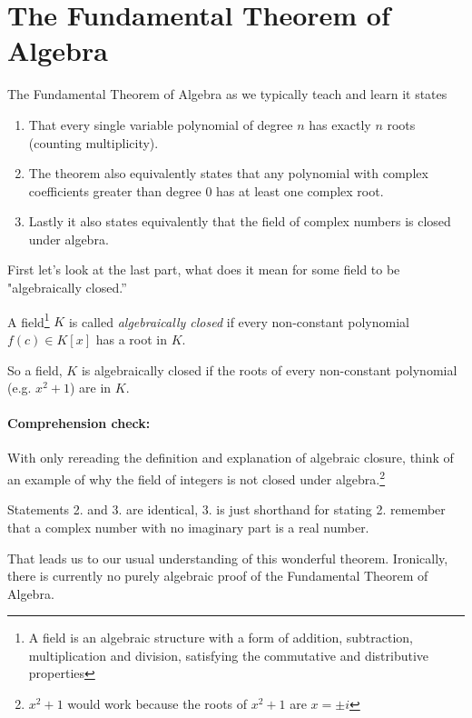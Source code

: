 \documentclass[12pt]{article}
\begin{document}








\section*{The Fundamental Theorem of Algebra}
The Fundamental Theorem of Algebra as we typically teach and learn it states 
\begin{enumerate}
\item That every single variable polynomial of degree $n$ has exactly $n$ roots (counting multiplicity).
\item The theorem also equivalently states that any polynomial with complex coefficients greater than degree 0 has at least one complex root.  
\item Lastly it also states equivalently that the field of complex numbers is closed under algebra.
\end{enumerate}

First let's look at the last part, what does it mean for some field to be "algebraically closed.''

A field\footnote{A field is an algebraic structure with a form of addition, subtraction, multiplication and division, satisfying the commutative and distributive properties} $K$ is called \emph{algebraically closed} if every non-constant polynomial $f(c) \in K[x]$ has a root in $K$.

So a field, $K$ is algebraically closed if the roots of every non-constant polynomial (e.g. $x^2+1$) are in $K$.

\paragraph*{Comprehension check:} With only rereading the definition and explanation of algebraic closure, think of an example of why the field of integers is not closed under algebra.\footnote{$x^2+1$ would work because the roots of $x^2+1$ are $x=\pm i$}

Statements 2. and 3. are identical, 3. is just shorthand for stating 2. remember that a complex number with no imaginary part is a real number.

That leads us to our usual understanding of this wonderful theorem.  Ironically, there is currently no purely algebraic proof of the Fundamental Theorem of Algebra.  
\end{document}

